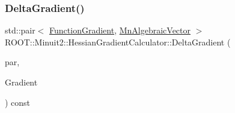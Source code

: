 \subsubsection{\texorpdfstring{DeltaGradient()}{DeltaGradient()}\hspace{0.1cm}{\footnotesize\ttfamily [1/3]}}
{\footnotesize\ttfamily std\+::pair$<$ \mbox{\hyperlink{classROOT_1_1Minuit2_1_1FunctionGradient}{Function\+Gradient}}, \mbox{\hyperlink{namespaceROOT_1_1Minuit2_a62ed97730a1ca8d3fbaec64a19aa11c9}{Mn\+Algebraic\+Vector}} $>$ R\+O\+O\+T\+::\+Minuit2\+::\+Hessian\+Gradient\+Calculator\+::\+Delta\+Gradient (\begin{DoxyParamCaption}\item[{const \mbox{\hyperlink{classROOT_1_1Minuit2_1_1MinimumParameters}{Minimum\+Parameters}} \&}]{par,  }\item[{const \mbox{\hyperlink{classROOT_1_1Minuit2_1_1FunctionGradient}{Function\+Gradient}} \&}]{Gradient }\end{DoxyParamCaption}) const}

